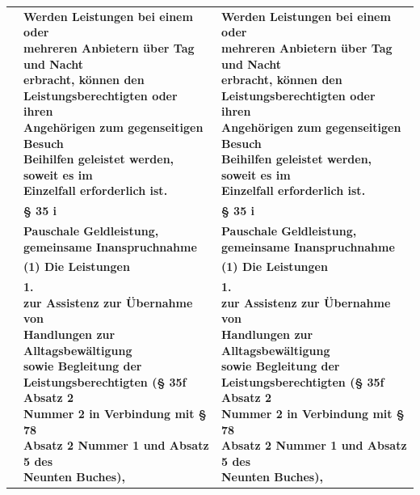 \documentclass[10pt,a4paper,landscape]{article}
\begin{document}
\begin{longtable}{|L{8.2cm}|L{8.2cm}|L{8.2cm}|}
 & \textbf{Werden Leistungen bei einem oder  \newline mehreren Anbietern über Tag und Nacht  \newline erbracht, können den  \newline Leistungsberechtigten oder ihren  \newline Angehörigen zum gegenseitigen Besuch  \newline Beihilfen geleistet werden, soweit es im  \newline Einzelfall erforderlich ist. } & \textbf{Werden Leistungen bei einem oder  \newline mehreren Anbietern über Tag und Nacht  \newline erbracht, können den  \newline Leistungsberechtigten oder ihren  \newline Angehörigen zum gegenseitigen Besuch  \newline Beihilfen geleistet werden, soweit es im  \newline Einzelfall erforderlich ist. } \\
\hhline{|---|}
 & \textbf{\S{} 35 i } & \textbf{\S{} 35 i } \\
\hhline{|---|}
 & \textbf{Pauschale Geldleistung,  \newline gemeinsame Inanspruchnahme } & \textbf{Pauschale Geldleistung,  \newline gemeinsame Inanspruchnahme } \\
\hhline{|---|}
 & \textbf{(1) Die Leistungen } & \textbf{(1) Die Leistungen } \\
\hhline{|---|}
 & \textbf{1.   \newline zur Assistenz zur Übernahme von  \newline Handlungen zur Alltagsbewältigung  \newline sowie Begleitung der  \newline Leistungsberechtigten (\S{} 35f Absatz 2  \newline Nummer 2 in Verbindung mit \S{} 78  \newline Absatz 2 Nummer 1 und Absatz 5 des  \newline Neunten Buches), } & \textbf{1.   \newline zur Assistenz zur Übernahme von  \newline Handlungen zur Alltagsbewältigung  \newline sowie Begleitung der  \newline Leistungsberechtigten (\S{} 35f Absatz 2  \newline Nummer 2 in Verbindung mit \S{} 78  \newline Absatz 2 Nummer 1 und Absatz 5 des  \newline Neunten Buches), } \\

\end{longtable}
\end{document}
